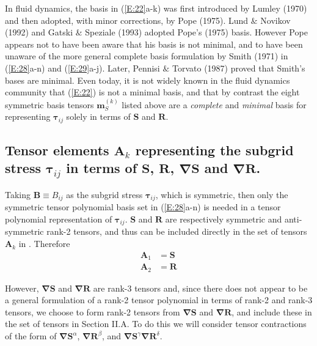 In fluid dynamics, the basis in (\ref{E:22}a-k) was first introduced by Lumley (1970) and then adopted, with minor corrections, by Pope (1975).  Lund $\&$ Novikov (1992) and Gatski $\&$ Speziale (1993) adopted Pope’s (1975) basis.  However Pope appears not to have been aware that his basis is not minimal, and to have been unaware of the more general complete basis formulation by Smith (1971) in (\ref{E:28}a-n) and (\ref{E:29}a-j).  Later, Pennisi $\&$ Torvato (1987) proved that Smith’s bases are minimal. Even today, it is not widely known in the fluid dynamics community that (\ref{E:22}) is not a minimal basis, and that by contrast the eight symmetric basis tensors $\mathbf{m}^{(k)}_S$   listed above are a \textit{complete} and \textit{minimal} basis for representing  $\mathbf{\tau}_{ij}$ solely in terms of $\mathbf{S}$ and $\mathbf{R}$. 


\subsection{Tensor elements $\mathbf{A}_k$ representing the subgrid stress $\mathbf{\tau}_{ij}$ in terms of $\mathbf{S}$, $\mathbf{R}$, $\mathbf{\nabla S}$  and $\mathbf{\nabla R}$.}
\label{sec:2C}

Taking  $\mathbf{B} \equiv B_{ij}$ as the subgrid stress $\mathbf{\tau}_{ij}$, which is symmetric, then only the symmetric tensor polynomial basis set in (\ref{E:28}a-n) is needed in a tensor polynomial representation of $\mathbf{\tau}_{ij}$. $\mathbf{S}$ and $\mathbf{R}$ are respectively symmetric and anti-symmetric rank-2 tensors, and thus can be included directly in the set of tensors  $\mathbf{A}_k$ in .  Therefore
%
\begin{subequations}
\label{E:31}
\begin{align}
	\mathbf{A}_1 &= \mathbf{S} \\ 
	\mathbf{A}_2 &= \mathbf{R}
\end{align}
\end{subequations}
%
%    

However, $\mathbf{\nabla S}$  and $\mathbf{\nabla R}$ are rank-3 tensors and, since there does not appear to be a general formulation of a rank-2 tensor polynomial in terms of rank-2 and rank-3 tensors, we choose to form rank-2 tensors from $\mathbf{\nabla S}$  and $\mathbf{\nabla R}$, and include these in the set of tensors   in Section II.A.  To do this we will consider tensor contractions of the form of $\mathbf{\nabla S}^{\alpha}$, $\mathbf{\nabla R}^{\beta}$, and $\mathbf{\nabla S}^{\gamma} \mathbf{\nabla R}^{\delta}$.


